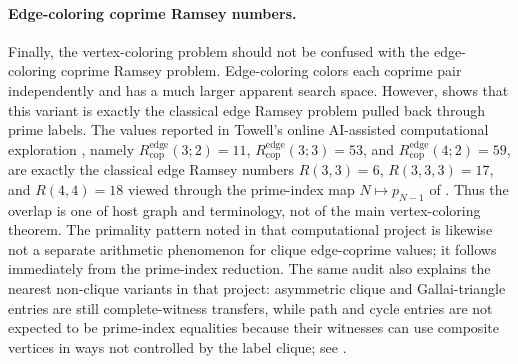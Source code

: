\documentclass[11pt]{article}
\theoremstyle{plain}
\theoremstyle{definition}
\theoremstyle{remark}
\newcommand{\Redge}{R_{\mathrm{cop}}^{\mathrm{edge}}}
\begin{document}
\paragraph{Edge-coloring coprime Ramsey numbers.}
Finally, the vertex-coloring problem should not be confused with the
edge-coloring coprime Ramsey problem.  Edge-coloring colors each coprime
pair independently and has a much larger apparent search space.  However,
 shows that this variant is exactly the classical
edge Ramsey problem pulled back through prime labels.  The values reported
in Towell's online AI-assisted computational exploration
\cite{towell-blog,towell-github},
namely $\Redge(3;2)=11$, $\Redge(3;3)=53$, and $\Redge(4;2)=59$, are exactly
the classical edge Ramsey numbers $R(3,3)=6$, $R(3,3,3)=17$, and
$R(4,4)=18$ viewed through the prime-index map $N\mapsto p_{N-1}$ of
.  Thus the overlap is one of host graph and
terminology, not of the main vertex-coloring theorem.  The primality pattern
noted in that computational project is likewise not a separate arithmetic
phenomenon for clique edge-coprime values; it follows immediately from the
prime-index reduction.
The same audit also explains the nearest non-clique variants in that project:
asymmetric clique and Gallai-triangle entries are still complete-witness
transfers, while path and cycle entries are not expected to be prime-index
equalities because their witnesses can use composite vertices in ways not
controlled by the label clique; see .
\end{document}
